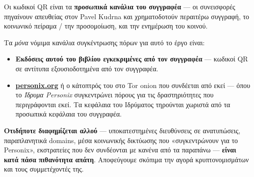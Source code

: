\begin{minipage}[t]{0.60\textwidth}
\vspace{0pt}
\begin{mdframed}[
  linewidth=0.7pt,roundcorner=5pt,
  innerleftmargin=10pt,innerrightmargin=10pt,
  innertopmargin=8pt,innerbottommargin=8pt,
  skipabove=0pt,skipbelow=0pt,
  linecolor=cbwarning!50,backgroundcolor=cbwarning!5,
  nobreak=true,
  needspace=4\baselineskip,
]
\footnotesize
Οι κωδικοί QR είναι τα \textbf{προσωπικά κανάλια του συγγραφέα} --- οι συνεισφορές πηγαίνουν απευθείας στον Pavel Kudrna και χρηματοδοτούν περαιτέρω συγγραφή, το κοινωνικό πείραμα / την προσομοίωση, και την ενημέρωση του κοινού.

\smallskip
Τα \emph{μόνα} νόμιμα κανάλια συγκέντρωσης πόρων για αυτό το έργο είναι:

\smallskip
\begin{itemize}
\setlength{\itemsep}{0pt}
\setlength{\topsep}{0pt}
\item \textbf{Εκδόσεις αυτού του βιβλίου εγκεκριμένες από τον συγγραφέα} --- κωδικοί QR σε αντίτυπα εξουσιοδοτημένα από τον συγγραφέα.
\item \href{https://personix.org}{\textbf{personix.org}} ή ο κάτοπτρός του στο Tor onion που συνδέεται από εκεί --- όπου το \emph{Ίδρυμα Personix} συγκεντρώνει πόρους για τις δραστηριότητες που περιγράφονται εκεί. Τα κεφάλαια του Ιδρύματος τηρούνται χωριστά από τα προσωπικά κεφάλαια του συγγραφέα.
\end{itemize}

\smallskip
\textbf{Οτιδήποτε διαφημίζεται αλλού} --- υποκατεστημένες διευθύνσεις σε ανατυπώσεις, παραπλανητικά domains, μέσα κοινωνικής δικτύωσης που «συγκεντρώνουν για το Personix», εκστρατείες που δεν συνδέονται με κανένα από τα παραπάνω --- \textbf{είναι κατά πάσα πιθανότητα απάτη}. Αποφεύγουμε σκόπιμα την αγορά κρυπτονομισμάτων και τους συμμετέχοντές της.
\end{mdframed}
\end{minipage}

\clearpage
